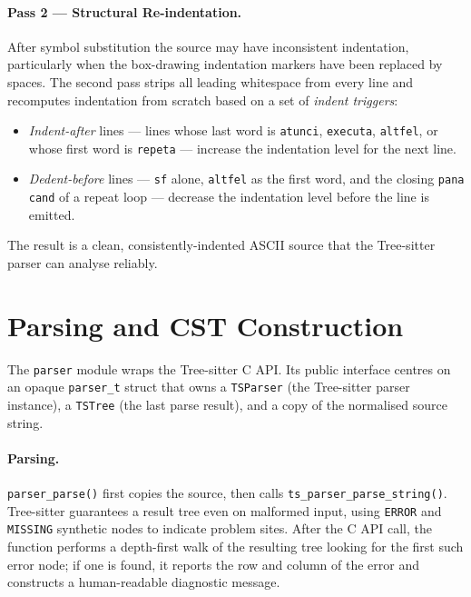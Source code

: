 \paragraph{Pass 2 --- Structural Re-indentation.}
After symbol substitution the source may have inconsistent indentation,
particularly when the box-drawing indentation markers have been replaced by
spaces.  The second pass strips all leading whitespace from every line and
recomputes indentation from scratch based on a set of \emph{indent triggers}:

\begin{itemize}
  \item \textit{Indent-after} lines --- lines whose last word is \texttt{atunci},
        \texttt{executa}, \texttt{altfel}, or whose first word is \texttt{repeta}
        --- increase the indentation level for the next line.
  \item \textit{Dedent-before} lines --- \texttt{sf} alone, \texttt{altfel} as
        the first word, and the closing \texttt{pana cand} of a repeat loop ---
        decrease the indentation level before the line is emitted.
\end{itemize}

The result is a clean, consistently-indented ASCII source that the Tree-sitter
parser can analyse reliably.

\section{Parsing and CST Construction}
\label{sec:parsing-ast}

The \texttt{parser} module wraps the Tree-sitter C API.  Its public interface
centres on an opaque \texttt{parser\_t} struct that owns a
\texttt{TSParser} (the Tree-sitter parser instance), a \texttt{TSTree} (the
last parse result), and a copy of the normalised source string.

\paragraph{Parsing.}
\texttt{parser\_parse()} first copies the source, then calls
\texttt{ts\_parser\_parse\_string()}.  Tree-sitter guarantees a result tree
even on malformed input, using \texttt{ERROR} and \texttt{MISSING} synthetic
nodes to indicate problem sites.  After the C API call, the function performs a
depth-first walk of the resulting tree looking for the first such error node;
if one is found, it reports the row and column of the error and constructs a
human-readable diagnostic message.

